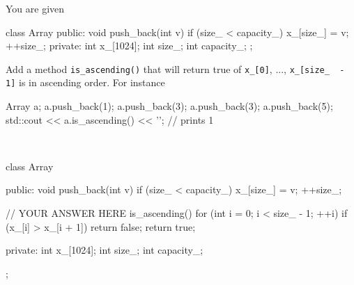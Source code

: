 \nextq
You are given
\begin{console}[fontsize=\footnotesize,frame=single]
class Array
{
public:
    void push_back(int v)
    {
        if (size_ < capacity_)
        {
            x_[size_] = v;
            ++size_;
        }
    }
private:
    int x_[1024];
    int size_;
    int capacity_;
};
\end{console}
Add a method \verb!is_ascending()! that will return true
of \verb!x_[0]!, ..., \verb!x_[size_  - 1]! is in ascending order.
For instance
\begin{console}[fontsize=\footnotesize,frame=single]
Array a;
a.push_back(1);
a.push_back(3);
a.push_back(3);
a.push_back(5);
std::cout << a.is_ascending() << '\n'; // prints 1
\end{console}
\\
\ANSWER
\begin{answercode}
class Array
{
public:
    void push_back(int v)
    {
        if (size_ < capacity_)
        {
            x_[size_] = v;
            ++size_;
        }
    }

    // YOUR ANSWER HERE
    is_ascending()
    {
      for (int i = 0; i < size_ - 1; ++i)
      {
        if (x_[i] > x_[i + 1])
        return false;
      }
      return true;
    }

private:
    int x_[1024];
    int size_;
    int capacity_;
};
\end{answercode}


